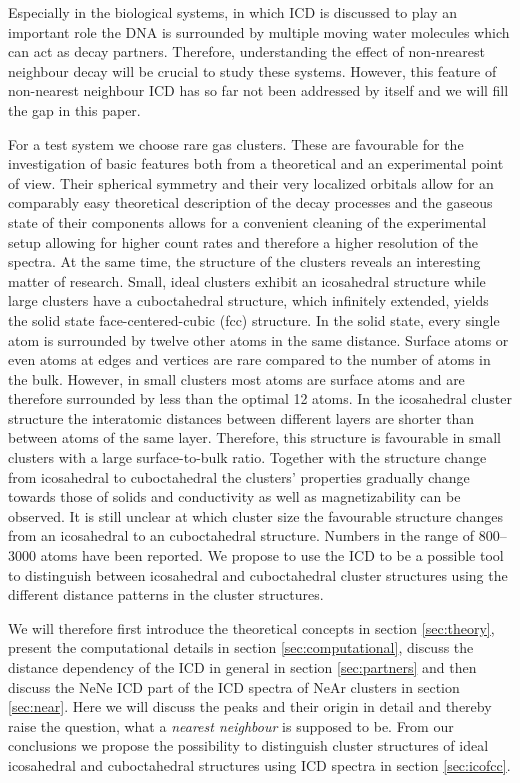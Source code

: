 Especially in the biological systems, in which ICD is discussed to play an
important role \cite{Alizadeh15,Gokhberg14,Trinter14}
the DNA is surrounded by multiple moving
water molecules which can act as decay partners. Therefore, understanding the
effect of non-nrearest neighbour decay will be crucial to study these systems.
However, this feature of non-nearest neighbour ICD
has so far not been addressed by itself and we will fill the gap in this
paper.

For a test system we choose rare gas clusters. These are favourable
for the investigation of basic features both
from a theoretical and an experimental point of view. Their spherical
symmetry and their very localized orbitals allow for an comparably easy
theoretical description of the decay processes and the gaseous state
of their components allows for a convenient cleaning of the experimental
setup allowing for higher count rates and therefore a higher resolution
of the spectra. At the same time, the structure of the clusters reveals an
interesting matter of research. Small, ideal clusters exhibit an icosahedral
structure while large clusters have a cuboctahedral structure, which
infinitely extended, yields the solid state face-centered-cubic (fcc) structure.
In the solid state, every single atom is surrounded by twelve other atoms in the
same distance. Surface atoms or even atoms at edges and vertices are rare
compared to the number of atoms in the bulk. 
However, in small clusters most atoms are surface atoms and are therefore
surrounded by less than the optimal 12 atoms.
In the icosahedral cluster structure the interatomic distances between different
layers are shorter than between atoms of the same layer. 
Therefore,
this structure is favourable in small clusters with a large surface-to-bulk ratio.
Together with the structure change from icosahedral to cuboctahedral
the clusters' properties gradually change towards those of solids and
conductivity as well as magnetizability can be observed. \cite{Benfield92}
It is still unclear at which cluster size the favourable structure changes from
an icosahedral to an cuboctahedral structure. Numbers in the range
of 800--3000 atoms have been reported. \cite{Hartke02,Pahl08}
We propose to use the ICD to be a possible tool to distinguish between
icosahedral and cuboctahedral cluster structures using the different distance
patterns in the cluster structures.

We will
therefore first introduce the theoretical concepts in section \ref{sec:theory},
present the computational details in section \ref{sec:computational},
discuss the distance dependency of the ICD in general
in section \ref{sec:partners} and then
discuss the NeNe ICD part of the ICD spectra of NeAr clusters
\cite{Fasshauer14_1} in section \ref{sec:near}. Here we will discuss the
peaks and their origin in detail and thereby
raise the question, what a \emph{nearest neighbour} is supposed to be. From
our conclusions we propose the possibility to distinguish cluster structures
of ideal icosahedral and cuboctahedral structures using ICD spectra in
section \ref{sec:icofcc}.

